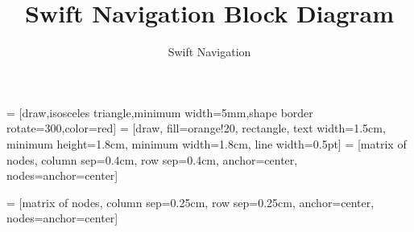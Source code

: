 \documentclass{article}
\title{Swift Navigation Block Diagram}
\author{Swift Navigation}
\begin{document}
 = [draw,isosceles triangle,minimum width=5mm,shape border rotate=300,color=red]
 = [draw, fill=orange!20, rectangle, text width=1.5cm, minimum height=1.8cm, minimum width=1.8cm, line width=0.5pt]
\def\filterSS{\node[block]{};
  \draw[line width=1pt] (-4mm,-2mm) to[in=220,out=40] (4mm,-2mm) 
                         (-4mm,0mm) to[in=220,out=40] (4mm,0mm) 
                         (-4mm,2mm) to[in=220,out=40] (4mm,2mm)
                         (-1mm,-1mm) to (1mm,1mm);}
 = [matrix of nodes,
      column sep=0.4cm,
      row sep=0.4cm,
      anchor=center,
      nodes={anchor=center}] 

 = [matrix of nodes,
      column sep=0.25cm,
      row sep=0.25cm,
      anchor=center,
      nodes={anchor=center}] 
\end{document}
